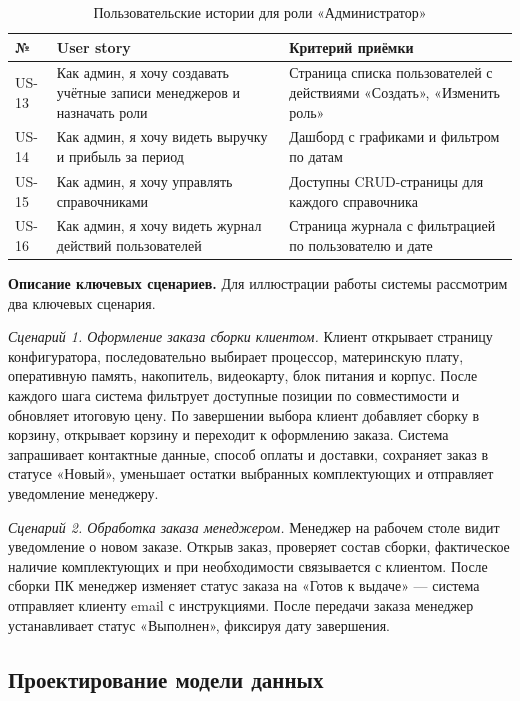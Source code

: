 \documentclass[14pt, a4paper]{extarticle}
\begin{document}
\begin{table}[ht!]
\caption{Пользовательские истории для роли «Администратор»}
\label{tab:us-adm}
\small
\begin{tabularx}{\textwidth}{|>{\centering\arraybackslash}p{}|>{\RaggedRight\arraybackslash}X|>{\RaggedRight\arraybackslash}X|}
\hline
\textbf{№} & \textbf{User story} & \textbf{Критерий приёмки} \\ \hline
US-13 & Как админ, я хочу создавать учётные записи менеджеров и назначать роли & Страница списка пользователей с действиями «Создать», «Изменить роль» \\ \hline
US-14 & Как админ, я хочу видеть выручку и прибыль за период & Дашборд с графиками и фильтром по датам \\ \hline
US-15 & Как админ, я хочу управлять справочниками & Доступны CRUD-страницы для каждого справочника \\ \hline
US-16 & Как админ, я хочу видеть журнал действий пользователей & Страница журнала с фильтрацией по пользователю и дате \\ \hline
\end{tabularx}
\end{table}

\textbf{Описание ключевых сценариев.} Для иллюстрации работы системы рассмотрим два ключевых сценария.

\emph{Сценарий 1. Оформление заказа сборки клиентом.} Клиент открывает страницу конфигуратора, последовательно выбирает процессор, материнскую плату, оперативную память, накопитель, видеокарту, блок питания и корпус. После каждого шага система фильтрует доступные позиции по совместимости и обновляет итоговую цену. По завершении выбора клиент добавляет сборку в корзину, открывает корзину и переходит к оформлению заказа. Система запрашивает контактные данные, способ оплаты и доставки, сохраняет заказ в статусе «Новый», уменьшает остатки выбранных комплектующих и отправляет уведомление менеджеру.

\emph{Сценарий 2. Обработка заказа менеджером.} Менеджер на рабочем столе видит уведомление о новом заказе. Открыв заказ, проверяет состав сборки, фактическое наличие комплектующих и при необходимости связывается с клиентом. После сборки ПК менеджер изменяет статус заказа на «Готов к выдаче» --- система отправляет клиенту email с инструкциями. После передачи заказа менеджер устанавливает статус «Выполнен», фиксируя дату завершения.

\subsection{Проектирование модели данных}
\end{document}
